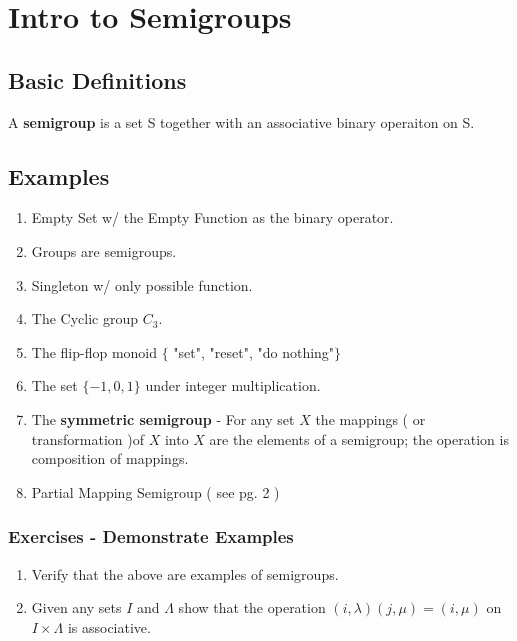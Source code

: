 \documentclass{article}
\begin{document}
\section{Intro to Semigroups}
\subsection{Basic Definitions}
A \textbf{semigroup} is a set S together with an associative binary operaiton on S.



\subsection{Examples}
\begin{enumerate}
	\item Empty Set w/ the Empty Function as the binary operator.
	\item Groups are semigroups.
	\item Singleton w/ only possible function.
	\item The Cyclic group $C_3$.
	\item The flip-flop monoid $\{$ "set", "reset", "do nothing"$\}$
	\item The set $\{-1, 0, 1\}$ under integer multiplication.
	\item The \textbf{symmetric semigroup} - For any set $X$ the mappings ( or transformation )of $X$ into $X$ are the elements of a semigroup; the operation is composition of mappings.
	\item Partial Mapping Semigroup ( see pg. 2 )
\end{enumerate}

\subsubsection{Exercises - Demonstrate Examples}
\begin{enumerate}
	\item Verify that the above are examples of semigroups.
	\item Given any sets $I$ and $\Lambda$ show that the operation $(i, \lambda)(j,\mu) = (i,\mu)$ on $I \times \Lambda$ is associative.
\end{enumerate}
\end{document}
